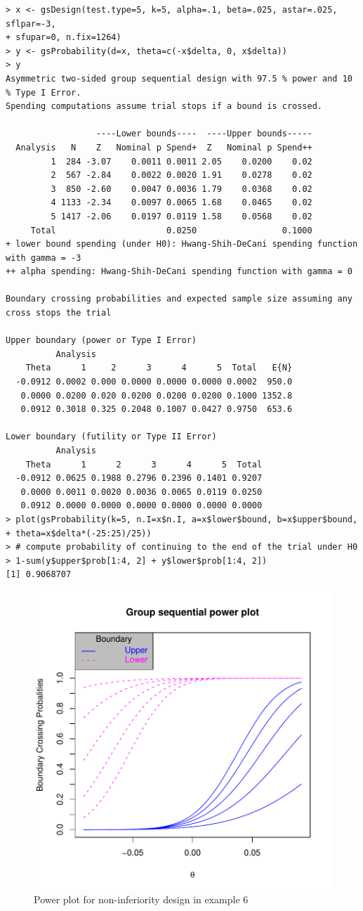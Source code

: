 \bigskip
\begin{verbatim}
> x <- gsDesign(test.type=5, k=5, alpha=.1, beta=.025, astar=.025, sflpar=-3,
+ sfupar=0, n.fix=1264)
> y <- gsProbability(d=x, theta=c(-x$delta, 0, x$delta))
> y
Asymmetric two-sided group sequential design with 97.5 % power and 10 % Type I Error.
Spending computations assume trial stops if a bound is crossed.

                  ----Lower bounds----  ----Upper bounds-----
  Analysis   N    Z   Nominal p Spend+  Z   Nominal p Spend++
         1  284 -3.07    0.0011 0.0011 2.05    0.0200    0.02
         2  567 -2.84    0.0022 0.0020 1.91    0.0278    0.02
         3  850 -2.60    0.0047 0.0036 1.79    0.0368    0.02
         4 1133 -2.34    0.0097 0.0065 1.68    0.0465    0.02
         5 1417 -2.06    0.0197 0.0119 1.58    0.0568    0.02
     Total                      0.0250                 0.1000 
+ lower bound spending (under H0): Hwang-Shih-DeCani spending function with gamma = -3
++ alpha spending: Hwang-Shih-DeCani spending function with gamma = 0

Boundary crossing probabilities and expected sample size assuming any cross stops the trial

Upper boundary (power or Type I Error)
          Analysis
    Theta      1     2      3      4      5  Total   E{N}
  -0.0912 0.0002 0.000 0.0000 0.0000 0.0000 0.0002  950.0
   0.0000 0.0200 0.020 0.0200 0.0200 0.0200 0.1000 1352.8
   0.0912 0.3018 0.325 0.2048 0.1007 0.0427 0.9750  653.6

Lower boundary (futility or Type II Error)
          Analysis
    Theta      1      2      3      4      5  Total
  -0.0912 0.0625 0.1988 0.2796 0.2396 0.1401 0.9207
   0.0000 0.0011 0.0020 0.0036 0.0065 0.0119 0.0250
   0.0912 0.0000 0.0000 0.0000 0.0000 0.0000 0.0000
> plot(gsProbability(k=5, n.I=x$n.I, a=x$lower$bound, b=x$upper$bound,
+ theta=x$delta*(-25:25)/25))
> # compute probability of continuing to the end of the trial under H0
> 1-sum(y$upper$prob[1:4, 2] + y$lower$prob[1:4, 2])
[1] 0.9068707
\end{verbatim}

\begin{center}%
\begin{figure}
\begin{center}
\includegraphics[width=.6\textwidth]{figs/noninferiority.pdf}
\end{center}
\caption{Power plot for non-inferiority design in example 6}
\end{figure}%

\end{center}


